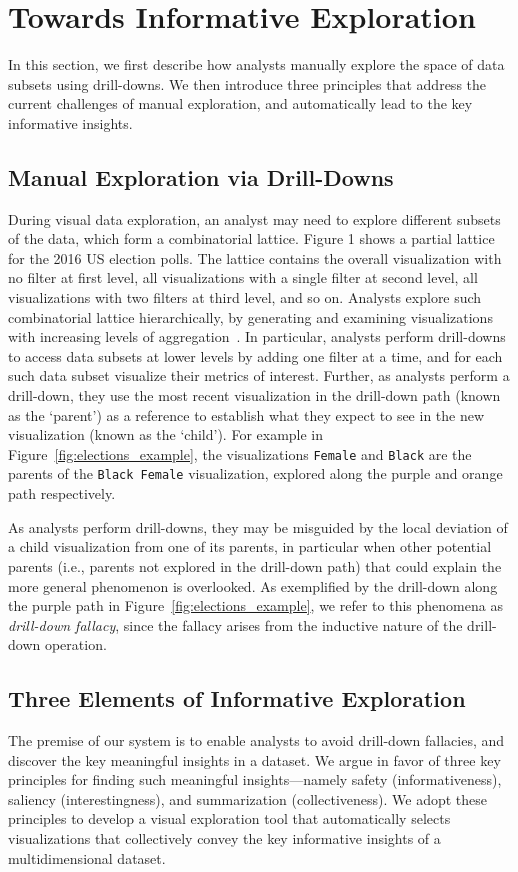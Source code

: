 
\section{Towards Informative Exploration}
In this section, we first describe how analysts manually explore the space of data subsets using drill-downs. We then introduce three principles that address the current challenges of manual exploration, and automatically lead to the key informative insights. 

\subsection{Manual Exploration via Drill-Downs}
During visual data exploration, an analyst may need to explore different subsets of the data, which form a combinatorial lattice. Figure 1 shows a partial lattice for the 2016 US election polls. The lattice contains the overall visualization with no filter at first level, all visualizations with a single filter at second level, all visualizations with two filters at third level, and so on. Analysts explore such combinatorial lattice hierarchically, by generating and examining visualizations with increasing levels of aggregation~\cite{Kim2017,Hullman2017,Hullman2013}. In particular, analysts perform drill-downs to access data subsets at lower levels by adding one filter at a time, and for each such data subset visualize their metrics of interest. Further, as analysts perform a drill-down, they use the most recent visualization in the drill-down path (known as the `parent') as a reference to establish what they expect to see in the new visualization (known as the `child'). For example in Figure~\ref{fig:elections_example}, the visualizations \texttt{Female} and \texttt{Black} are the parents of the \texttt{Black Female} visualization, explored along the purple and orange path respectively.

As analysts perform drill-downs, they may be misguided by the local deviation of a child visualization from one of its parents, in particular when other potential parents (i.e., parents not explored in the drill-down path) that could explain the more general phenomenon is overlooked. As exemplified by the drill-down along the purple path in Figure~\ref{fig:elections_example}, we refer to this phenomena as \emph{drill-down fallacy}, since the fallacy arises from the inductive nature of the drill-down operation. 

\subsection{Three Elements of Informative Exploration}
The premise of our system is to enable analysts to avoid drill-down fallacies, and discover the key meaningful insights in a dataset. We argue in favor of three key principles for finding such meaningful insights---namely safety (informativeness), saliency (interestingness), and summarization (collectiveness). We adopt these principles to develop a visual exploration tool that automatically selects visualizations that collectively convey the key informative insights of a multidimensional dataset.

